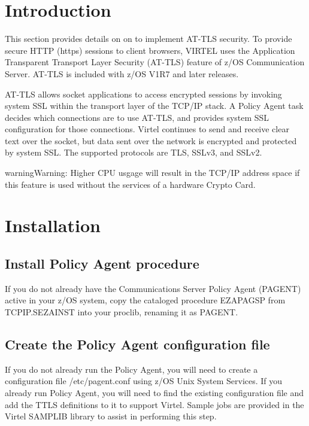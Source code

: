 \documentclass[letterpaper,10pt,english]{sphinxmanual}
\begin{document}
\section{Introduction}
\label{\detokenize{connectivity_guide:id73}}
This section provides details on on to implement AT-TLS security. To provide secure HTTP (https) sessions to client browsers, VIRTEL uses the Application Transparent Transport Layer Security (AT-TLS) feature of z/OS Communication Server. AT-TLS is included with z/OS V1R7 and later releases.

AT-TLS allows socket applications to access encrypted sessions by invoking system SSL within the transport layer of the TCP/IP stack. A Policy Agent task decides which connections are to use AT-TLS, and provides system SSL configuration for those connections. Virtel continues to send and receive clear text over the socket, but data sent over the network is encrypted and protected by system SSL. The supported protocols are TLS, SSLv3, and SSLv2.

\begin{sphinxadmonition}{warning}{Warning:}
Higher CPU usgage will result in the TCP/IP address space if this feature is used without the services of a hardware Crypto Card.
\end{sphinxadmonition}

\ignorespaces 

\section{Installation}
\label{\detokenize{connectivity_guide:installation}}\label{\detokenize{connectivity_guide:index-157}}

\subsection{Install Policy Agent procedure}
\label{\detokenize{connectivity_guide:install-policy-agent-procedure}}
If you do not already have the Communications Server Policy Agent (PAGENT) active in your z/OS system, copy the cataloged procedure EZAPAGSP from TCPIP.SEZAINST into your proclib, renaming it as PAGENT.


\subsection{Create the Policy Agent configuration file}
\label{\detokenize{connectivity_guide:create-the-policy-agent-configuration-file}}
If you do not already run the Policy Agent, you will need to create a configuration file /etc/pagent.conf using z/OS Unix System Services. If you already run Policy Agent, you will need to find the existing configuration file and add the TTLS definitions to it to support Virtel. Sample jobs are provided in the Virtel SAMPLIB library to assist in performing this step.
\end{document}
